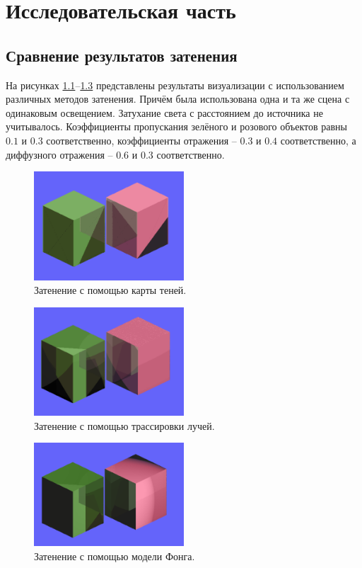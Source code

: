 \chapter{Исследовательская часть}

\section{Сравнение результатов затенения}
На рисунках \ref{img:rsm}--\ref{img:fong} представлены результаты
визуализации с использованием различных методов затенения.
Причём была использована одна и та же сцена с одинаковым освещением.
Затухание света с расстоянием до источника не учитывалось.
Коэффициенты пропускания зелёного и розового объектов равны $0.1$ и $0.3$
соответственно, коэффициенты отражения -- $0.3$ и $0.4$ соответственно,
а диффузного отражения -- $0.6$ и $0.3$ соответственно.

\begin{figure}[H]
	\centering
	\includegraphics[width=0.5\textwidth]{img/rsm.png}
	\caption{Затенение с помощью карты теней.}
	\label{img:rsm}
\end{figure}

\begin{figure}[H]
	\centering
	\includegraphics[width=0.5\textwidth]{img/tracing.png}
	\caption{Затенение с помощью трассировки лучей.}
	\label{img:tracing}
\end{figure}

\begin{figure}[H]
	\centering
	\includegraphics[width=0.5\textwidth]{img/fong.png}
	\caption{Затенение с помощью модели Фонга.}
	\label{img:fong}
\end{figure}

